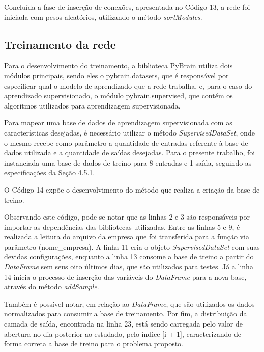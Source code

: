 

Concluída a fase de inserção de conexões, apresentada no Código 13, a rede foi iniciada com pesos aleatórios, utilizando o método \textit{sortModules}.

\subsection{Treinamento da rede}
Para o desenvolvimento do treinamento, a biblioteca PyBrain utiliza dois módulos principais, sendo eles o pybrain.datasets, que é responsável por especificar qual o modelo de aprendizado que a rede trabalha, e, para o caso do aprendizado supervisionado, o módulo pybrain.supervised, que contém os algoritmos utilizados para aprendizagem supervisionada.

Para mapear uma base de dados de aprendizagem supervisionada com as características desejadas, é necessário utilizar o método \textit{SupervisedDataSet}, onde o mesmo recebe como parâmetro a quantidade de entradas referente à base de dados utilizada e a quantidade de saídas desejadas. Para o presente trabalho, foi instanciada uma base de dados de treino para 8 entradas e 1 saída, seguindo as especificações da Seção 4.5.1.

O Código 14 expõe o desenvolvimento do método que realiza a criação da base de treino.



Observando este código, pode-se notar que as linhas 2 e 3 são responsáveis por importar as dependências das bibliotecas utilizadas. Entre as linhas 5 e 9, é realizada a leitura do arquivo da empresa que foi transferida para a função via parâmetro (nome\_empresa). A linha 11 cria o objeto \textit{SupervisedDataSet} com suas devidas configurações, enquanto a linha 13 consome a base de treino a partir do \textit{DataFrame} sem seus oito últimos dias, que são utilizados para testes. Já a linha 14 inicia o processo de inserção das variáveis do \textit{DataFrame} para a nova base, através do método \textit{addSample}.

Também é possível notar, em relação ao \textit{DataFrame}, que são utilizados os dados normalizados para consumir a base de treinamento. Por fim, a distribuição da camada de saída, encontrada na linha 23, está sendo carregada pelo valor de abertura no dia posterior ao estudado, pelo índice [i + 1], caracterizando de forma correta a base de treino para o problema proposto.

